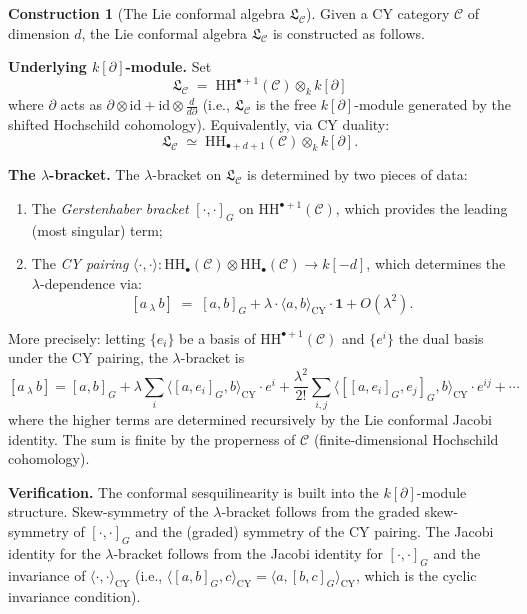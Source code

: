 \documentclass[11pt]{article}
\theoremstyle{plain}
\theoremstyle{definition}
\newtheorem{construction}[theorem]{Construction}
\theoremstyle{remark}
\newcommand{\id}{\mathrm{id}}
\newcommand{\CY}{\mathrm{CY}}
\newcommand{\HH}{\mathrm{HH}}
\newcommand{\cC}{\mathcal{C}}
\newcommand{\frakL}{\mathfrak{L}}
\begin{document}
\begin{construction}[The Lie conformal algebra $\frakL_\cC$]
\label{constr:lie-conformal-from-cy}
Given a CY category $\cC$ of dimension $d$, the Lie conformal algebra $\frakL_\cC$ is constructed as follows.

\medskip
\noindent\textbf{Underlying $k[\partial]$-module.}\; Set
\[
\frakL_\cC \;=\; \HH^{\bullet+1}(\cC) \otimes_k k[\partial]
\]
where $\partial$ acts as $\partial \otimes \id + \id \otimes \frac{d}{d\partial}$ (i.e., $\frakL_\cC$ is the free $k[\partial]$-module generated by the shifted Hochschild cohomology). Equivalently, via CY duality:
\[
\frakL_\cC \;\simeq\; \HH_{\bullet+d+1}(\cC) \otimes_k k[\partial].
\]

\medskip
\noindent\textbf{The $\lambda$-bracket.}\; The $\lambda$-bracket on $\frakL_\cC$ is determined by two pieces of data:
\begin{enumerate}[label=(\alph*)]
\item The \emph{Gerstenhaber bracket} $[\cdot, \cdot]_G$ on $\HH^{\bullet+1}(\cC)$, which provides the leading (most singular) term;
\item The \emph{CY pairing} $\langle \cdot, \cdot \rangle \colon \HH_\bullet(\cC) \otimes \HH_\bullet(\cC) \to k[-d]$, which determines the $\lambda$-dependence via:
\[
[a \,{}_\lambda\, b] \;=\; [a, b]_G + \lambda \cdot \langle a, b \rangle_{\mathrm{CY}} \cdot \mathbf{1} + O(\lambda^2).
\]
\end{enumerate}
More precisely: letting $\{e_i\}$ be a basis of $\HH^{\bullet+1}(\cC)$ and $\{e^i\}$ the dual basis under the CY pairing, the $\lambda$-bracket is
\begin{equation}
\label{eq:lambda-bracket}
[a \,{}_\lambda\, b] = [a, b]_G + \lambda \sum_i \langle [a, e_i]_G, b \rangle_{\CY} \cdot e^i + \frac{\lambda^2}{2!} \sum_{i,j} \langle [[a, e_i]_G, e_j]_G, b \rangle_{\CY} \cdot e^{ij} + \cdots
\end{equation}
where the higher terms are determined recursively by the Lie conformal Jacobi identity. The sum is finite by the properness of $\cC$ (finite-dimensional Hochschild cohomology).

\medskip
\noindent\textbf{Verification.}\; The conformal sesquilinearity is built into the $k[\partial]$-module structure. Skew-symmetry of the $\lambda$-bracket follows from the graded skew-symmetry of $[\cdot,\cdot]_G$ and the (graded) symmetry of the CY pairing. The Jacobi identity for the $\lambda$-bracket follows from the Jacobi identity for $[\cdot,\cdot]_G$ and the invariance of $\langle \cdot, \cdot \rangle_{\CY}$ (i.e., $\langle [a,b]_G, c \rangle_{\CY} = \langle a, [b,c]_G \rangle_{\CY}$, which is the cyclic invariance condition).
\end{construction}
\end{document}
